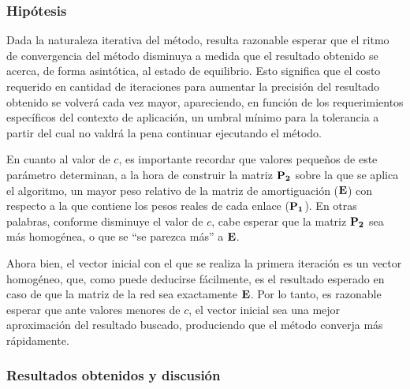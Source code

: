             \subsubsection*{Hipótesis}
            Dada la naturaleza iterativa del método, resulta razonable esperar que el ritmo de convergencia del método disminuya a medida que el resultado obtenido se acerca, de forma asintótica, al estado de equilibrio. Esto significa que el costo requerido en cantidad de iteraciones para aumentar la precisión del resultado obtenido se volverá cada vez mayor, apareciendo, en función de los requerimientos específicos del contexto de aplicación, un umbral mínimo para la tolerancia a partir del cual no valdrá la pena continuar ejecutando el método.

            En cuanto al valor de $c$, es importante recordar que valores pequeños de este parámetro determinan, a la hora de construir la matriz $\mathbf{P_2}$ sobre la que se aplica el algoritmo, un mayor peso relativo de la matriz de amortiguación ($\mathbf{E}$) con respecto a la que contiene los pesos reales de cada enlace ($\mathbf{P_1}$). En otras palabras, conforme disminuye el valor de $c$, cabe esperar que la matriz $\mathbf{P_2}$ sea más homogénea, o que se “se parezca más” a $\mathbf{E}$.

            Ahora bien, el vector inicial con el que se realiza la primera iteración es un vector homogéneo, que, como puede deducirse fácilmente, es el resultado esperado en caso de que la matriz de la red sea exactamente $\mathbf{E}$. Por lo tanto, es razonable esperar que ante valores menores de $c$, el vector inicial sea una mejor aproximación del resultado buscado, produciendo que el método converja más rápidamente.

            \subsubsection*{Resultados obtenidos y discusión}


